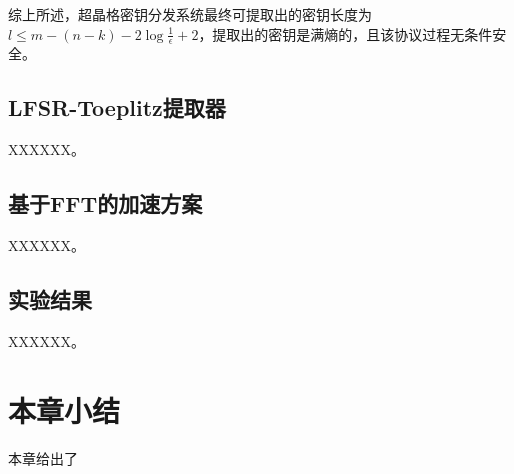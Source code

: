 综上所述，超晶格密钥分发系统最终可提取出的密钥长度为$l\leq m-(n-k)-2\log \frac{1}{\epsilon}+2$，提取出的密钥是满熵的，且该协议过程无条件安全。


\subsection{LFSR-Toeplitz提取器}

XXXXXX。


\subsection{基于FFT的加速方案}

XXXXXX。

\subsection{实验结果}

XXXXXX。




\section{本章小结}
本章给出了

